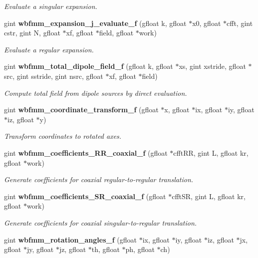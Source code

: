 \begin{DoxyCompactItemize}
\begin{DoxyCompactList}\small\item\em Evaluate a singular expansion. \end{DoxyCompactList}\item 
gint {\bf wbfmm\+\_\+expansion\+\_\+j\+\_\+evaluate\+\_\+f} (gfloat k, gfloat $\ast$x0, gfloat $\ast$cfft, gint cstr, gint N, gfloat $\ast$xf, gfloat $\ast$field, gfloat $\ast$work)
\begin{DoxyCompactList}\small\item\em Evaluate a regular expansion. \end{DoxyCompactList}\item 
gint {\bf wbfmm\+\_\+total\+\_\+dipole\+\_\+field\+\_\+f} (gfloat k, gfloat $\ast$xs, gint xstride, gfloat $\ast$src, gint sstride, gint nsrc, gfloat $\ast$xf, gfloat $\ast$field)
\begin{DoxyCompactList}\small\item\em Compute total field from dipole sources by direct evaluation. \end{DoxyCompactList}\item 
gint {\bf wbfmm\+\_\+coordinate\+\_\+transform\+\_\+f} (gfloat $\ast$x, gfloat $\ast$ix, gfloat $\ast$iy, gfloat $\ast$iz, gfloat $\ast$y)
\begin{DoxyCompactList}\small\item\em Transform coordinates to rotated axes. \end{DoxyCompactList}\item 
gint {\bf wbfmm\+\_\+coefficients\+\_\+\+R\+R\+\_\+coaxial\+\_\+f} (gfloat $\ast$cfft\+R\+R, gint L, gfloat kr, gfloat $\ast$work)
\begin{DoxyCompactList}\small\item\em Generate coefficients for coaxial regular-\/to-\/regular translation. \end{DoxyCompactList}\item 
gint {\bf wbfmm\+\_\+coefficients\+\_\+\+S\+R\+\_\+coaxial\+\_\+f} (gfloat $\ast$cfft\+S\+R, gint L, gfloat kr, gfloat $\ast$work)
\begin{DoxyCompactList}\small\item\em Generate coefficients for coaxial singular-\/to-\/regular translation. \end{DoxyCompactList}\item 
gint {\bf wbfmm\+\_\+rotation\+\_\+angles\+\_\+f} (gfloat $\ast$ix, gfloat $\ast$iy, gfloat $\ast$iz, gfloat $\ast$jx, gfloat $\ast$jy, gfloat $\ast$jz, gfloat $\ast$th, gfloat $\ast$ph, gfloat $\ast$ch)

\end{DoxyCompactItemize}
